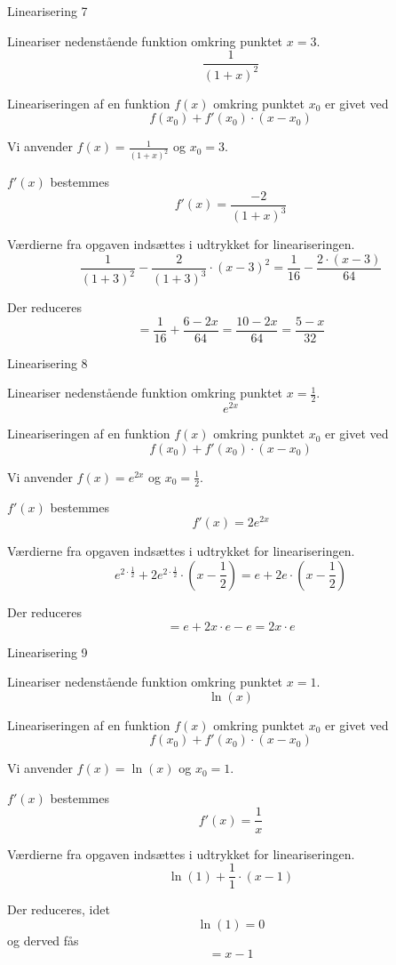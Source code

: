 \documentclass{article}
\begin{document}
\begin{exercise}{Linearisering 7}

Lineariser nedenstående funktion omkring punktet $x = 3$.
\[
\frac{1}{(1 + x)^2}
\]


\hint
Lineariseringen af en funktion $f(x)$
omkring punktet $x_0$ er givet ved
\[
f(x_0) + f'(x_0) \cdot (x - x_0)
\]

\hint
Vi anvender $f(x) = \frac{1}{(1 + x)^2}$ og $x_0 = 3$.

\hint
$f'(x)$ bestemmes
\[
f'(x) = \frac{-2}{(1 + x)^3}
\]

\hint
Værdierne fra opgaven indsættes i udtrykket for lineariseringen.
\[
\frac{1}{(1 + 3)^2} - \frac{2}{(1 + 3)^3} \cdot (x - 3)^2 = \frac{1}{16} - \frac{2 \cdot (x - 3)}{64}
\]

\hint
Der reduceres
\[
= \frac{1}{16} + \frac{6 - 2x}{64} = \frac{10 - 2x}{64} = \frac{5 - x}{32}
\]

\end{exercise}

\begin{exercise}{Linearisering 8}

Lineariser nedenstående funktion omkring punktet $x = \frac{1}{2}$.
\[
e^{2x}
\]


\hint
Lineariseringen af en funktion $f(x)$
omkring punktet $x_0$ er givet ved
\[
f(x_0) + f'(x_0) \cdot (x - x_0)
\]

\hint
Vi anvender $f(x) = e^{2x}$ og $x_0 = \frac{1}{2}$.

\hint
$f'(x)$ bestemmes
\[
f'(x) = 2 e^{2x}
\]

\hint
Værdierne fra opgaven indsættes i udtrykket for lineariseringen.
\[
e^{2 \cdot \frac{1}{2}} + 2 e^{2 \cdot \frac{1}{2}} \cdot (x - \frac{1}{2}) = e + 2 e \cdot (x - \frac{1}{2})
\]

\hint
Der reduceres
\[
= e + 2x \cdot e - e = 2x \cdot e
\]

\end{exercise}

\begin{exercise}{Linearisering 9}

Lineariser nedenstående funktion omkring punktet $x = 1$.
\[
\ln(x)
\]


\hint
Lineariseringen af en funktion $f(x)$
omkring punktet $x_0$ er givet ved
\[
f(x_0) + f'(x_0) \cdot (x - x_0)
\]

\hint
Vi anvender $f(x) = \ln(x)$ og $x_0 = 1$.

\hint
$f'(x)$ bestemmes
\[
f'(x) = \frac{1}{x}
\]

\hint
Værdierne fra opgaven indsættes i udtrykket for lineariseringen.
\[
\ln(1) + \frac{1}{1} \cdot (x - 1)
\]

\hint
Der reduceres, idet
\[
\ln(1) = 0
\]
og derved fås
\[
= x - 1
\]

\end{exercise}
\end{document}
